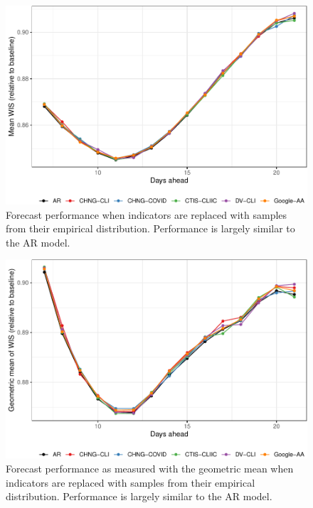 \clearpage

\begin{figure}

{\centering \includegraphics[width=\textwidth]{fig/fcast-booted-1} 

}

\caption{Forecast performance when indicators are replaced with samples from their empirical distribution. Performance is largely similar to the AR model.}\label{fig:fcast-booted}
\end{figure}

\clearpage

\begin{figure}

{\centering \includegraphics[width=\textwidth]{fig/fcast-booted-adjusted-1} 

}

\caption{Forecast performance as measured with the geometric mean when indicators are replaced with samples from their empirical distribution. Performance is largely similar to the AR model.}\label{fig:fcast-booted-adjusted}
\end{figure}

